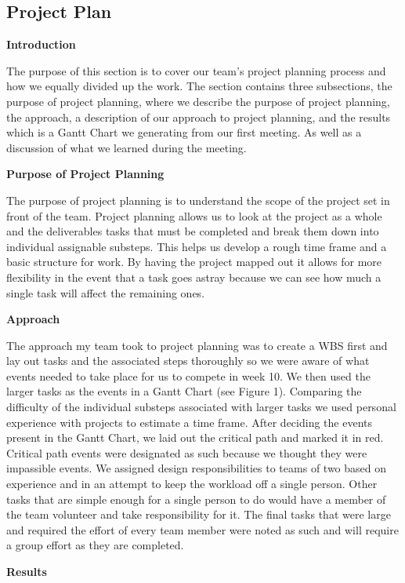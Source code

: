 \documentclass[12pt,letterpaper,titlepage]{article}
\begin{document}
\subsection{Project Plan}
\textbf{Introduction} 

The purpose of this section is to cover our team's project planning process and how we equally divided up the work. The section contains three subsections, the purpose of project planning, where we describe the purpose of project planning, the approach, a description of our approach to project planning, and the results which is a Gantt Chart we generating from our first meeting. As well as a discussion of what we learned during the meeting. 

\smallskip\noindent\textbf{Purpose of Project Planning} 

The purpose of project planning is to understand the scope of the project set in front of the team. Project planning allows us to look at the project as a whole and the deliverables tasks that must be completed and break them down into individual assignable substeps. This helps us develop a rough time frame and a basic structure for work. By having the project mapped out it allows for more flexibility in the event that a task goes astray because we can see how much a single task will affect the remaining ones. 

\smallskip\noindent\textbf{Approach} 

The approach my team took to project planning was to create a WBS first and lay out tasks and the associated steps thoroughly so we were aware of what events needed to take place for us to compete in week 10. We then used the larger tasks as the events in a Gantt Chart (see Figure 1). Comparing the difficulty of the individual substeps associated with larger tasks we used personal experience with projects to estimate a time frame. After deciding the events present in the Gantt Chart, we laid out the critical path and marked it in red. Critical path events were designated as such because we thought they were impassible events. We assigned design responsibilities to teams of two based on experience and in an attempt to keep the workload off a single person. Other tasks that are simple enough for a single person to do would have a member of the team volunteer and take responsibility for it. The final tasks that were large and required the effort of every team member were noted as such and will require a group effort as they are completed. 

\smallskip\noindent\textbf{Results}
\end{document}
